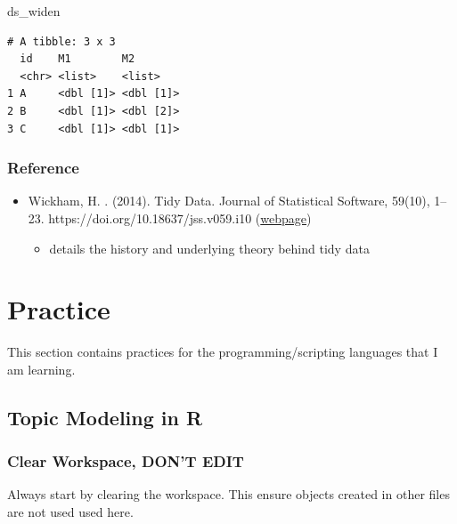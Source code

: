\documentclass[
  letterpaper,
  DIV=11,
  numbers=noendperiod]{scrreprt}
\newenvironment{Shaded}{\begin{snugshade}}{\end{snugshade}}
\newcommand{\NormalTok}[1]{\textcolor[rgb]{0.00,0.23,0.31}{#1}}
\providecommand{\tightlist}{%
  \setlength{\itemsep}{0pt}\setlength{\parskip}{0pt}}\usepackage{longtable,booktabs,array}
\begin{document}
\begin{Shaded}
\begin{Highlighting}[]
\NormalTok{ds\_widen}
\end{Highlighting}
\end{Shaded}

\begin{verbatim}
# A tibble: 3 x 3
  id    M1        M2       
  <chr> <list>    <list>   
1 A     <dbl [1]> <dbl [1]>
2 B     <dbl [1]> <dbl [2]>
3 C     <dbl [1]> <dbl [1]>
\end{verbatim}

\section{Reference}\label{reference}

\begin{itemize}
\tightlist
\item
  Wickham, H. . (2014). Tidy Data. Journal of Statistical Software,
  59(10), 1--23. https://doi.org/10.18637/jss.v059.i10
  (\href{https://www.jstatsoft.org/article/view/v059i10}{webpage})

  \begin{itemize}
  \tightlist
  \item
    details the history and underlying theory behind tidy data
  \end{itemize}
\end{itemize}

\part{Practice}

This section contains practices for the programming/scripting languages
that I am learning.

\chapter{Topic Modeling in R}\label{topic-modeling-in-r}

\section*{Clear Workspace, DON'T
EDIT}\label{clear-workspace-dont-edit-8}


Always start by clearing the workspace. This ensure objects created in
other files are not used used here.
\end{document}
